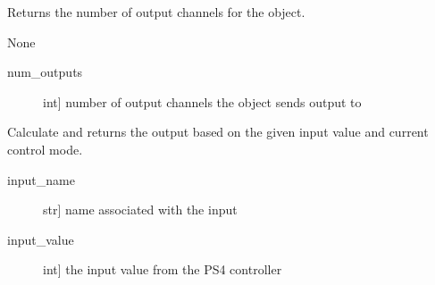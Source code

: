 \documentclass[letterpaper,10pt,english]{sphinxmanual}
\begin{document}
\begin{fulllineitems}
\begin{fulllineitems}
\begin{description}
\end{description}

\end{fulllineitems}


\begin{fulllineitems}
\label{\detokenize{specific:NeckTiltOutput.NeckTiltOutput.get_num_channels}}
\sphinxAtStartPar
Returns the number of output channels for the object.

\sphinxAtStartPar
{}

\sphinxAtStartPar
None

\sphinxAtStartPar
{}
\begin{description}
\item[{num\_outputs}] \leavevmode{[}int{]}
\sphinxAtStartPar
number of output channels the object sends output to

\end{description}

\end{fulllineitems}


\begin{fulllineitems}
\label{\detokenize{specific:NeckTiltOutput.NeckTiltOutput.get_output}}
\sphinxAtStartPar
Calculate and returns the output based on the given input value and current control mode.

\sphinxAtStartPar
{}
\begin{description}
\item[{input\_name}] \leavevmode{[}str{]}
\sphinxAtStartPar
name associated with the input

\item[{input\_value}] \leavevmode{[}int{]}
\sphinxAtStartPar
the input value from the PS4 controller

\end{description}


\end{fulllineitems}
\end{fulllineitems}
\end{document}
